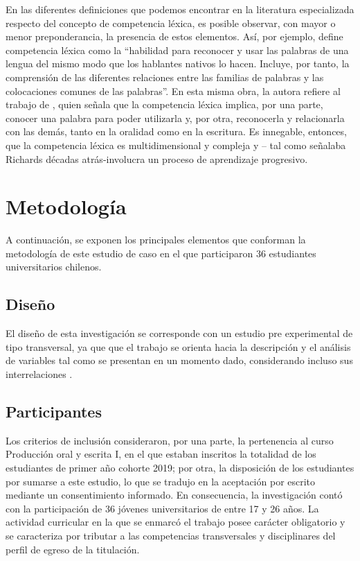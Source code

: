 \documentclass{textolivre-html}
\begin{document}
En las diferentes definiciones que podemos encontrar en la literatura
especializada respecto del concepto de competencia léxica, es posible observar,
con mayor o menor preponderancia, la presencia de estos elementos. Así, por
ejemplo, \textcite[p. 57]{molina2007} define competencia léxica como la
“habilidad para reconocer y usar las palabras de una lengua del mismo modo que
los hablantes nativos lo hacen. Incluye, por tanto, la comprensión de las
diferentes relaciones entre las familias de palabras y las colocaciones comunes
de las palabras”. En esta misma obra, la autora refiere al trabajo de \textcite[p. 152]{catalan2002},
quien señala que la competencia léxica implica, por
una parte, conocer una palabra para poder utilizarla y, por otra, reconocerla y
relacionarla con las demás, tanto en la oralidad como en la escritura. Es
innegable, entonces, que la competencia léxica es multidimensional y compleja y
-- tal como señalaba Richards décadas atrás-involucra un proceso de aprendizaje
progresivo.



\section{Metodología}\label{sec-metodologia}
A continuación, se exponen los principales elementos que conforman
la metodología de este estudio de caso en el que participaron 36 estudiantes
universitarios chilenos.

\subsection{Diseño}\label{sec-diseno}
El diseño de esta investigación se corresponde con un estudio pre experimental
de tipo transversal, ya que que el trabajo se orienta hacia la descripción y el
análisis de variables tal como se presentan en un momento dado, considerando
incluso sus interrelaciones \cite{acuna2006}.

\subsection{Participantes}\label{sec-participantes}
Los criterios de inclusión consideraron, por una parte, la pertenencia al
curso Producción oral y escrita I, en el que estaban inscritos la totalidad de
los estudiantes de primer año cohorte 2019; por otra, la disposición de los
estudiantes por sumarse a este estudio, lo que se tradujo en la aceptación por
escrito mediante un consentimiento informado. En consecuencia, la investigación
contó con la participación de 36 jóvenes universitarios de entre 17 y 26 años.
La actividad curricular en la que se enmarcó el trabajo posee carácter
obligatorio y se caracteriza por tributar a las competencias transversales y
disciplinares del perfil de egreso de la titulación.
\end{document}
